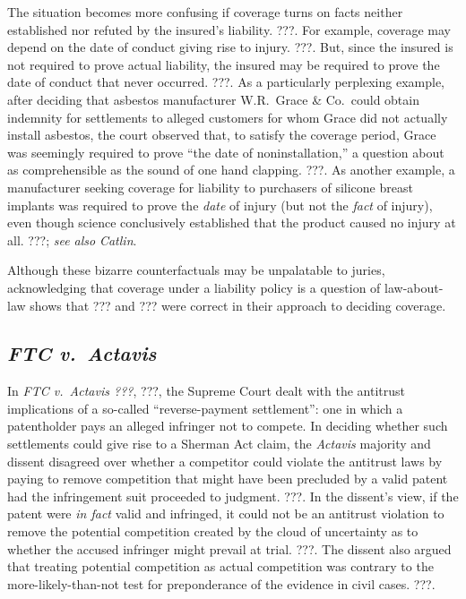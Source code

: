 \documentclass[
  12pt,
  letterpaper,
]{scrartcl}
\begin{document}
The situation becomes more confusing if coverage turns on facts neither
established nor refuted by the insured's liability. ???. For example, coverage
may depend on the date of conduct giving rise to injury. ???. But, since the
insured is not required to prove actual liability, the insured may be required
to prove the date of conduct that never occurred. ???. As a particularly
perplexing example, after deciding that asbestos manufacturer W.R.~Grace \&
Co.~could obtain indemnity for settlements to alleged customers for whom Grace
did not actually install asbestos, the court observed that, to satisfy the
coverage period, Grace was seemingly required to prove ``the date of
noninstallation,'' a question about as comprehensible as the sound of one hand
clapping. ???. As another example, a manufacturer seeking coverage for
liability to purchasers of silicone breast implants was required to prove the
\emph{date} of injury (but not the \emph{fact} of injury), even though science
conclusively established that the product caused no injury at all. ???;
\textit{see also} \textit{Catlin}.

Although these bizarre counterfactuals may be unpalatable to juries,
acknowledging that coverage under a liability policy is a question of
law-about-law shows that ??? and ??? were correct in their approach to deciding
coverage.


\subsection{\textit{FTC v.~Actavis}}

In \textit{FTC v.~Actavis ???}, ???, the Supreme Court dealt with the antitrust
implications of a so-called ``reverse-payment settlement'': one in which a
patentholder pays an alleged infringer not to compete. In deciding whether such
settlements could give rise to a Sherman Act claim, the \textit{Actavis}
majority and dissent disagreed over whether a competitor could violate the
antitrust laws by paying to remove competition that might have been precluded
by a valid patent had the infringement suit proceeded to judgment. ???. In the
dissent's view, if the patent were \emph{in fact} valid and infringed, it could
not be an antitrust violation to remove the potential competition created by
the cloud of uncertainty as to whether the accused infringer might prevail at
trial. ???. The dissent also argued that treating potential competition as
actual competition was contrary to the more-likely-than-not test for
preponderance of the evidence in civil cases. ???.
\end{document}
